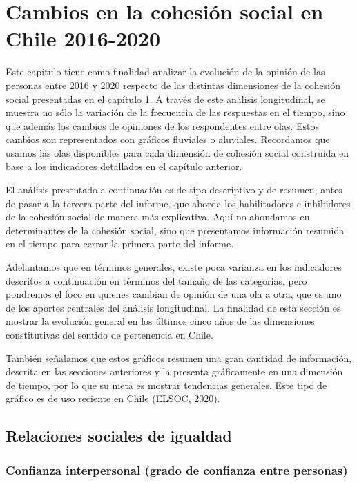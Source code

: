 \documentclass[
  12pt,
]{book}
\begin{document}
\hypertarget{cambios-en-la-cohesiuxf3n-social-en-chile-2016-2020}{%
\chapter{Cambios en la cohesión social en Chile 2016-2020}\label{cambios-en-la-cohesiuxf3n-social-en-chile-2016-2020}}

Este capítulo tiene como finalidad analizar la evolución de la opinión de las personas entre 2016 y 2020 respecto de las distintas dimensiones de la cohesión social presentadas en el capítulo 1. A través de este análisis longitudinal, se muestra no sólo la variación de la frecuencia de las respuestas en el tiempo, sino que además los cambios de opiniones de los respondentes entre olas. Estos cambios son representados con gráficos fluviales o aluviales. Recordamos que usamos las olas disponibles para cada dimensión de cohesión social construida en base a los indicadores detallados en el capítulo anterior.

El análisis presentado a continuación es de tipo descriptivo y de resumen, antes de pasar a la tercera parte del informe, que aborda los habilitadores e inhibidores de la cohesión social de manera más explicativa. Aquí no ahondamos en determinantes de la cohesión social, sino que presentamos información resumida en el tiempo para cerrar la primera parte del informe.

Adelantamos que en términos generales, existe poca varianza en los indicadores descritos a continuación en términos del tamaño de las categorías, pero pondremos el foco en quienes cambian de opinión de una ola a otra, que es uno de los aportes centrales del análisis longitudinal. La finalidad de esta sección es mostrar la evolución general en los últimos cinco años de las dimensiones constitutivas del sentido de pertenencia en Chile.

También señalamos que estos gráficos resumen una gran cantidad de información, descrita en las secciones anteriores y la presenta gráficamente en una dimensión de tiempo, por lo que su meta es mostrar tendencias generales. Este tipo de gráfico es de uso reciente en Chile (ELSOC, 2020).

\hypertarget{relaciones-sociales-de-igualdad-1}{%
\section{Relaciones sociales de igualdad}\label{relaciones-sociales-de-igualdad-1}}

\hypertarget{confianza-interpersonal-grado-de-confianza-entre-personas}{%
\subsection{Confianza interpersonal (grado de confianza entre personas)}\label{confianza-interpersonal-grado-de-confianza-entre-personas}}
\end{document}

